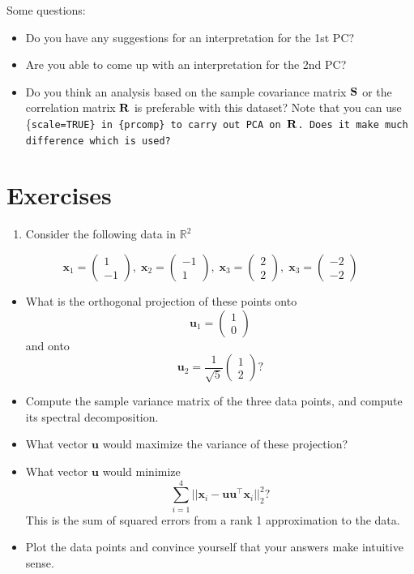 \documentclass[]{book}
\providecommand{\tightlist}{%
  \setlength{\itemsep}{0pt}\setlength{\parskip}{0pt}}
\theoremstyle{definition}
\theoremstyle{definition}
\theoremstyle{definition}
\theoremstyle{remark}
\begin{document}
Some questions:

\begin{itemize}
\item
  Do you have any suggestions for an interpretation for the 1st PC?
\item
  Are you able to come up with an interpretation for the 2nd PC?
\item
  Do you think an analysis based on the sample covariance matrix \({\bf S}\) or the
  correlation matrix \({\bf R}\) is preferable with this dataset? Note that you can use \{\tt scale=TRUE\} in \{\tt prcomp\}
  to carry out PCA on \({\bf R}\). Does it make much difference which is used?
\end{itemize}

\hypertarget{exercises-1}{%
\section{Exercises}\label{exercises-1}}

\begin{enumerate}
\def\labelenumi{\arabic{enumi}.}
\tightlist
\item
  Consider the following data in \(\mathbb{R}^2\)
\end{enumerate}

\[\boldsymbol x_1 =\begin{pmatrix}1\\-1\end{pmatrix},\; \boldsymbol x_2 =\begin{pmatrix}-1\\1\end{pmatrix},
\;\boldsymbol x_3 =\begin{pmatrix}2\\2\end{pmatrix},\;\boldsymbol x_3 =\begin{pmatrix}-2\\-2\end{pmatrix}\]

\begin{itemize}
\item
  What is the orthogonal projection of these points onto \[\boldsymbol u_1 = \begin{pmatrix}1\\0\end{pmatrix}\] and onto \[\boldsymbol u_2 =\frac{1}{\sqrt{5}}\begin{pmatrix}1\\2\end{pmatrix}?\]
\item
  Compute the sample variance matrix of the three data points, and compute its spectral decomposition.
\item
  What vector \(\boldsymbol u\) would maximize the variance of these projection?
\item
  What vector \(\boldsymbol u\) would minimize
  \[\sum_{i=1}^4 ||\boldsymbol x_i -\boldsymbol u\boldsymbol u^\top \boldsymbol x_i||^2_2?\]
  This is the sum of squared errors from a rank 1 approximation to the data.
\item
  Plot the data points and convince yourself that your answers make intuitive sense.
\end{itemize}
\end{document}
